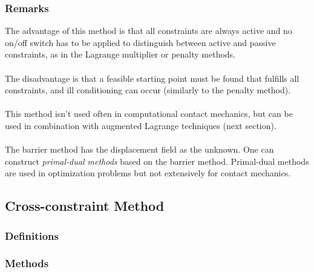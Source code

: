 \documentclass[12pt,3p]{article}
\numberwithin{equation}{section}
\begin{document}
\subsubsection{Remarks}
The advantage of this method is that all constraints are always active and no on/off switch has to be applied to distinguish between active and passive constraints, as in the Lagrange multiplier or penalty methods.  \\ \\
The disadvantage is that a feasible starting point must be found that fulfills all constraints, and ill conditioning can occur (similarly to the penalty method). \\ \\
This method isn't used often in computational contact mechanics, but can be used in combination with augmented Lagrange techniques (next section). \\ \\
The barrier method has the displacement field as the unknown. One can construct \textit{primal-dual methods} based on the barrier method. Primal-dual methods are used in optimization problems but not extensively for contact mechanics. 

\subsection{Cross-constraint Method}
\subsubsection{Definitions}

\subsubsection{Methods}
\end{document}
